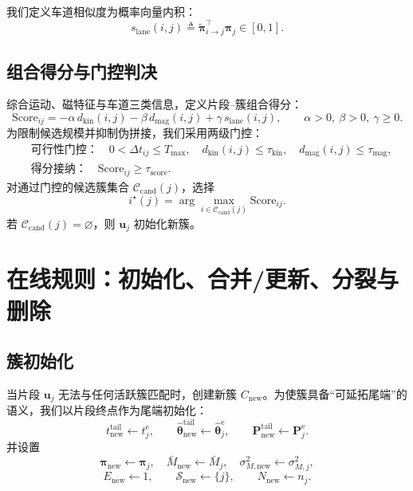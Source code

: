 \documentclass{xdupgthesis}
\begin{document}
我们定义车道相似度为概率向量内积：
\begin{equation}
	s_{\mathrm{lane}}(i,j)
	\triangleq
	\tilde{\boldsymbol{\pi}}_{i\rightarrow j}^{\top}\boldsymbol{\pi}_j
	\in[0,1].
	\tag{4-18}
\end{equation}

\subsection{组合得分与门控判决}
综合运动、磁特征与车道三类信息，定义片段--簇组合得分：
\begin{equation}
	\mathrm{Score}_{ij}
	=
	-\alpha\, d_{\mathrm{kin}}(i,j)
	-\beta\, d_{\mathrm{mag}}(i,j)
	+\gamma\, s_{\mathrm{lane}}(i,j),
	\qquad
	\alpha>0,\ \beta>0,\ \gamma\ge 0.
	\tag{4-19}
\end{equation}
为限制候选规模并抑制伪拼接，我们采用两级门控：
\begin{align}
	&\textbf{可行性门控：}\quad
	0<\Delta t_{ij}\le T_{\max},\quad
	d_{\mathrm{kin}}(i,j)\le \tau_{\mathrm{kin}},\quad
	d_{\mathrm{mag}}(i,j)\le \tau_{\mathrm{mag}},
	\tag{4-20}\\
	&\textbf{得分接纳：}\quad
	\mathrm{Score}_{ij}\ge \tau_{\mathrm{score}}.
	\tag{4-21}
\end{align}
对通过门控的候选簇集合 $\mathcal{C}_{\mathrm{cand}}(j)$，选择
\begin{equation}
	i^\star(j)=\arg\max_{i\in\mathcal{C}_{\mathrm{cand}}(j)}\mathrm{Score}_{ij}.
	\tag{4-22}
\end{equation}
若 $\mathcal{C}_{\mathrm{cand}}(j)=\varnothing$，则 $\mathbf{u}_j$ 初始化新簇。

\section{在线规则：初始化、合并/更新、分裂与删除}
\subsection{簇初始化}
当片段 $\mathbf{u}_j$ 无法与任何活跃簇匹配时，创建新簇 $C_{\mathrm{new}}$。为使簇具备“可延拓尾端”的语义，我们以片段终点作为尾端初始化：
\begin{equation}
	t_{\mathrm{new}}^{\mathrm{tail}}\leftarrow t_j^{\mathrm{e}},\qquad
	\hat{\boldsymbol{\theta}}_{\mathrm{new}}^{\mathrm{tail}}\leftarrow \hat{\boldsymbol{\theta}}_j^{\mathrm{e}},\qquad
	\mathbf{P}_{\mathrm{new}}^{\mathrm{tail}}\leftarrow \mathbf{P}_j^{\mathrm{e}}.
	\tag{4-23}
\end{equation}
并设置
\begin{equation}
	\boldsymbol{\pi}_{\mathrm{new}}\leftarrow \boldsymbol{\pi}_j,\quad
	\bar M_{\mathrm{new}}\leftarrow \bar M_j,\quad
	\sigma_{M,\mathrm{new}}^2\leftarrow \sigma_{M,j}^2,
	\tag{4-24}
\end{equation}
\begin{equation}
	E_{\mathrm{new}}\leftarrow 1,\qquad
	\mathcal{S}_{\mathrm{new}}\leftarrow\{j\},\qquad
	N_{\mathrm{new}}\leftarrow n_j.
	\tag{4-25}
\end{equation}
\end{document}
